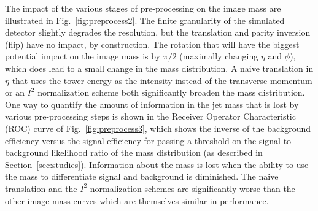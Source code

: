 The impact of the various stages of pre-processing on the image mass are illustrated in Fig.~\ref{fig:preprocess2}.  The finite granularity of the simulated detector slightly degrades the resolution, but the translation and parity inversion (flip) have no impact, by construction.  The rotation that will have the biggest potential impact on the image mass is by $\pi/2$ (maximally changing $\eta$ and $\phi$), which does lead to a small change in the mass distribution.  A naive translation in $\eta$ that uses the tower energy as the intensity instead of the transverse momentum or an $I^2$ normalization scheme both significantly broaden the mass distribution.  One way to quantify the amount of information in the jet mass that is lost by various pre-processing steps is shown in the Receiver Operator Characteristic (ROC) curve of Fig.~\ref{fig:preprocess3}, which shows the inverse of the background efficiency versus the signal efficiency for passing a threshold on the signal-to-background likelihood ratio of the mass distribution (as described in Section~\ref{sec:studies}).  Information about the mass is lost when the ability to use the mass to differentiate signal and background is diminished.  The naive translation and the $I^2$ normalization schemes are significantly worse than the other image mass curves which are themselves similar in performance. 

